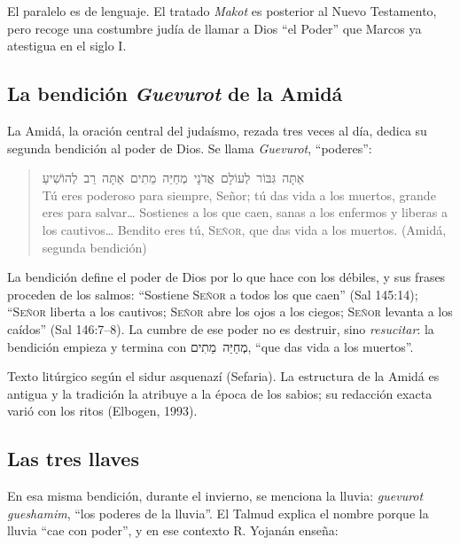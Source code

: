 \documentclass[11pt,letterpaper]{article}
\newcommand{\heb}[1]{\mbox{\foreignlanguage{hebrew}{#1}}}
\newcommand{\SENOR}{\textsc{Señor}}
\begin{document}
\begin{nota}[Precisión]
El paralelo es de lenguaje. El tratado \emph{Makot} es posterior al Nuevo Testamento, pero recoge una costumbre judía de llamar a Dios ``el Poder'' que Marcos ya atestigua en el siglo I.
\end{nota}

\subsection{La bendición \emph{Guevurot} de la Amidá}

La Amidá, la oración central del judaísmo, rezada tres veces al día, dedica su segunda bendición al poder de Dios. Se llama \emph{Guevurot}, ``poderes'':

\begin{quote}\small
\heb{אַתָּה גִּבּוֹר לְעוֹלָם אֲדֹנָי מְחַיֵּה מֵתִים אַתָּה רַב לְהוֹשִׁיעַ}\\
Tú eres poderoso para siempre, Señor; tú das vida a los muertos, grande eres para salvar\ldots{} Sostienes a los que caen, sanas a los enfermos y liberas a los cautivos\ldots{} Bendito eres tú, \SENOR, que das vida a los muertos. (Amidá, segunda bendición)
\end{quote}

La bendición define el poder de Dios por lo que hace con los débiles, y sus frases proceden de los salmos: ``Sostiene \SENOR{} a todos los que caen'' (Sal 145:14); ``\SENOR{} liberta a los cautivos; \SENOR{} abre los ojos a los ciegos; \SENOR{} levanta a los caídos'' (Sal 146:7--8). La cumbre de ese poder no es destruir, sino \emph{resucitar}: la bendición empieza y termina con \heb{מְחַיֵּה מֵתִים}, ``que das vida a los muertos''.

\begin{nota}[Precisión]
Texto litúrgico según el sidur asquenazí (Sefaria). La estructura de la Amidá es antigua y la tradición la atribuye a la época de los sabios; su redacción exacta varió con los ritos (Elbogen, 1993).
\end{nota}

\subsection{Las tres llaves}

En esa misma bendición, durante el invierno, se menciona la lluvia: \emph{guevurot gueshamim}, ``los poderes de la lluvia''. El Talmud explica el nombre porque la lluvia ``cae con poder'', y en ese contexto R. Yojanán enseña:
\end{document}
